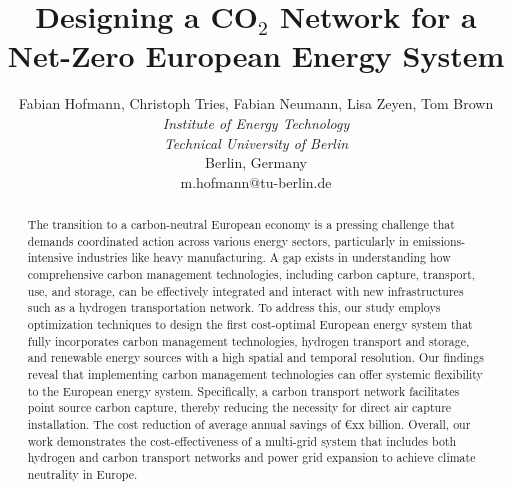 \documentclass[twocolumn]{article}
\newcommand{\carbon}{CO$_2$}
\begin{document}
\title{Designing a \carbon{} Network for a Net-Zero European Energy System}

\author{
    Fabian Hofmann, Christoph Tries, Fabian Neumann, Lisa Zeyen, Tom Brown \\
    \textit{Institute of Energy Technology} \\
    \textit{Technical University of Berlin}\\
    Berlin, Germany \\
    m.hofmann@tu-berlin.de
}


\maketitle

\begin{abstract}
    The transition to a carbon-neutral European economy is a pressing challenge that demands coordinated action across various energy sectors, particularly in emissions-intensive industries like heavy manufacturing.
    A gap exists in understanding how comprehensive carbon management technologies, including carbon capture, transport, use, and storage, can be effectively integrated and interact with new infrastructures such as a hydrogen transportation network.
    To address this, our study employs optimization techniques to design the first cost-optimal European energy system that fully incorporates carbon management technologies, hydrogen transport and storage, and renewable energy sources with a high spatial and temporal resolution.
    Our findings reveal that implementing carbon management technologies can offer systemic flexibility to the European energy system. Specifically, a carbon transport network facilitates point source carbon capture, thereby reducing the necessity for direct air capture installation. The cost reduction of  average annual savings of €xx billion.
    Overall, our work demonstrates the cost-effectiveness of a multi-grid system that includes both hydrogen and carbon transport networks and power grid expansion to achieve climate neutrality in Europe.



\end{abstract}
\end{document}
